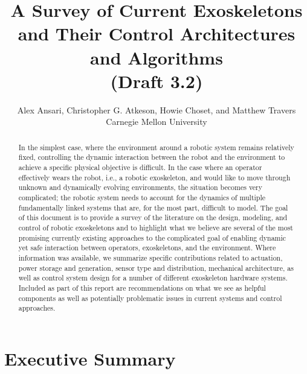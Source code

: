 \documentclass[letterpaper,12pt,fullpage]{article}
\begin{document}
\title{A Survey of Current Exoskeletons\\ and Their Control Architectures and
Algorithms\\
(Draft 3.2)}

\author{Alex Ansari, Christopher G. Atkeson, Howie Choset, and Matthew Travers\\
Carnegie Mellon University}

\maketitle

\begin{abstract}
In the simplest case, where the environment around a robotic system remains relatively fixed, controlling the dynamic interaction between the robot and the environment to achieve a specific physical objective is difficult.  In the case where an operator effectively wears the robot, i.e., a robotic exoskeleton, and would like to move through unknown and dynamically evolving environments, the situation becomes very complicated; the robotic system needs to account for the dynamics of multiple fundamentally linked systems that are, for the most part, difficult to model.  The goal of this document is to provide a survey of the literature on the design, modeling, and control of robotic exoskeletons and to highlight what we believe are several of the most promising currently existing approaches to the complicated goal of enabling dynamic yet safe interaction between operators, exoskeletons, and the environment.  Where information was available, we summarize specific contributions related to actuation, power storage and generation, sensor type and distribution, mechanical architecture, as well as control system design for a number of different exoskeleton hardware systems.  Included as part of this report are recommendations on what we see as helpful components as well as potentially problematic issues in current systems and control approaches. 
\end{abstract}

\section{Executive Summary}
\end{document}

